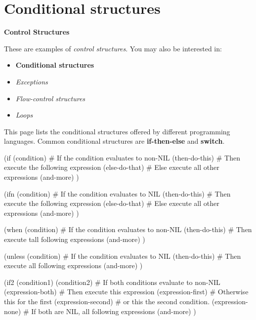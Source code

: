 \pagebreak{}
\section*{Conditional structures}


\textbf{Control Structures}

These are examples of \emph{control structures}. You may also be
interested in:

\begin{itemize}
\item
  \textbf{Conditional structures}
\item
  \emph{Exceptions}
\item
  \emph{Flow-control structures}
\item
  \emph{Loops}
\end{itemize}

This page lists the conditional structures offered by different
programming languages. Common conditional structures are
\textbf{if-then-else} and \textbf{switch}.



\begin{wideverbatim}

(if (condition)                  # If the condition evaluates to non-NIL
   (then-do-this)                # Then execute the following expression
   (else-do-that)                # Else execute all other expressions
   (and-more) )

(ifn (condition)                 # If the condition evaluates to NIL
   (then-do-this)                # Then execute the following expression
   (else-do-that)                # Else execute all other expressions
   (and-more) )

(when (condition)                # If the condition evaluates to non-NIL
   (then-do-this)                # Then execute tall following expressions
   (and-more) )

(unless (condition)              # If the condition evaluates to NIL
   (then-do-this)                # Then execute all following expressions
   (and-more) )

(if2 (condition1) (condition2)   # If both conditions evaluate to non-NIL
   (expression-both)             # Then execute this expression
   (expression-first)            # Otherwise this for the first
   (expression-second)           # or this the second condition.
   (expression-none)             # If both are NIL, all following expressions
   (and-more) )

\end{wideverbatim}

